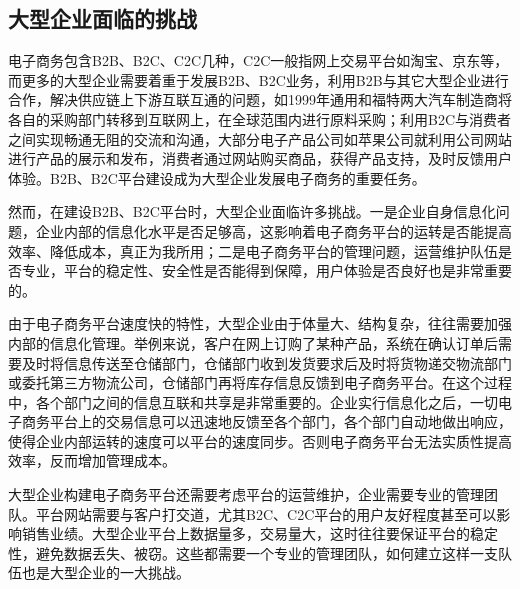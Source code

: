 \documentclass[UTF8]{ctexart}
\begin{document}
\subsection{大型企业面临的挑战}
电子商务包含B2B、B2C、C2C几种，C2C一般指网上交易平台如淘宝、京东等，而更多的大型企业需要着重于发展B2B、B2C业务，利用B2B与其它大型企业进行合作，解决供应链上下游互联互通的问题，如1999年通用和福特两大汽车制造商将各自的采购部门转移到互联网上，在全球范围内进行原料采购；\cite{Book}利用B2C与消费者之间实现畅通无阻的交流和沟通，大部分电子产品公司如苹果公司就利用公司网站进行产品的展示和发布，消费者通过网站购买商品，获得产品支持，及时反馈用户体验。B2B、B2C平台建设成为大型企业发展电子商务的重要任务。\par
然而，在建设B2B、B2C平台时，大型企业面临许多挑战。一是企业自身信息化问题，企业内部的信息化水平是否足够高，这影响着电子商务平台的运转是否能提高效率、降低成本，真正为我所用；二是电子商务平台的管理问题，运营维护队伍是否专业，平台的稳定性、安全性是否能得到保障，用户体验是否良好也是非常重要的。\par
由于电子商务平台速度快的特性，大型企业由于体量大、结构复杂，往往需要加强内部的信息化管理。举例来说，客户在网上订购了某种产品，系统在确认订单后需要及时将信息传送至仓储部门，仓储部门收到发货要求后及时将货物递交物流部门或委托第三方物流公司，仓储部门再将库存信息反馈到电子商务平台。在这个过程中，各个部门之间的信息互联和共享是非常重要的。企业实行信息化之后，一切电子商务平台上的交易信息可以迅速地反馈至各个部门，各个部门自动地做出响应，使得企业内部运转的速度可以平台的速度同步。否则电子商务平台无法实质性提高效率，反而增加管理成本。\par
大型企业构建电子商务平台还需要考虑平台的运营维护，企业需要专业的管理团队。平台网站需要与客户打交道，尤其B2C、C2C平台的用户友好程度甚至可以影响销售业绩。大型企业平台上数据量多，交易量大，这时往往要保证平台的稳定性，避免数据丢失、被窃。这些都需要一个专业的管理团队，如何建立这样一支队伍也是大型企业的一大挑战。
\end{document}
